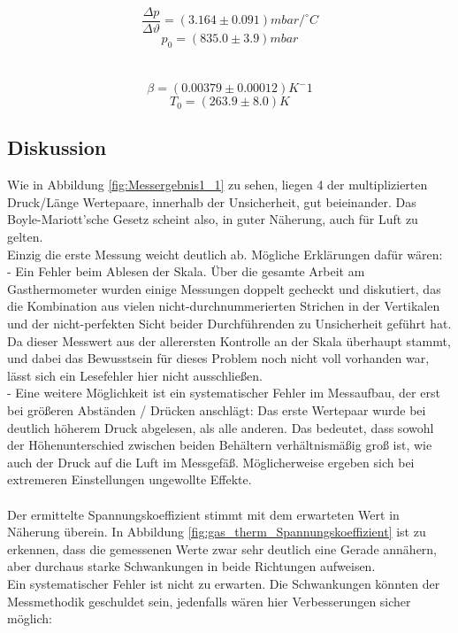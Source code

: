 \documentclass[12pt,a4paper]{article}
\begin{document}
\begin{multicols}{2}
$$\frac{\Delta p}{\Delta \vartheta} = (3.164 \pm 0.091) mbar/ ^\circ C$$
$$ p_0 = (835.0 \pm 3.9) mbar$$\\
\\
$$\beta = (0.00379 \pm 0.00012) K^-1$$
$$T_0 =(263.9 \pm 8.0)K$$



\subsection{Diskussion}

Wie in Abbildung \ref{fig:Messergebnis1_1} zu sehen, liegen 4 der multiplizierten Druck/Länge Wertepaare, innerhalb der Unsicherheit, gut beieinander. Das Boyle-Mariott'sche Gesetz scheint also, in guter Näherung, auch für Luft zu gelten.\\
Einzig die erste Messung weicht deutlich ab. Mögliche Erklärungen dafür wären:\\
\indent - Ein Fehler beim Ablesen der Skala. Über die gesamte Arbeit am Gasthermometer wurden einige Messungen doppelt gecheckt und diskutiert, das die Kombination aus vielen nicht-durchnummerierten Strichen in der Vertikalen und der nicht-perfekten Sicht beider Durchführenden zu Unsicherheit geführt hat.\\
Da dieser Messwert aus der allerersten Kontrolle an der Skala überhaupt stammt, und dabei das Bewusstsein für dieses Problem noch nicht voll vorhanden war,  lässt sich ein Lesefehler hier nicht ausschließen.\\
\indent - Eine weitere Möglichkeit ist ein systematischer Fehler im Messaufbau, der erst bei größeren Abständen / Drücken anschlägt: Das erste Wertepaar wurde bei deutlich höherem Druck abgelesen, als alle anderen. Das bedeutet, dass sowohl der Höhenunterschied zwischen beiden Behältern verhältnismäßig groß ist, wie auch der Druck auf die Luft im Messgefäß. Möglicherweise ergeben sich bei extremeren Einstellungen ungewollte Effekte.\\
\\
Der ermittelte Spannungskoeffizient stimmt mit dem erwarteten Wert in Näherung überein. In Abbildung \ref{fig:gas_therm_Spannungskoeffizient} ist zu erkennen, dass die gemessenen Werte zwar sehr deutlich eine Gerade annähern, aber durchaus starke Schwankungen in beide Richtungen aufweisen.\\
Ein systematischer Fehler ist nicht zu erwarten. Die Schwankungen könnten der Messmethodik geschuldet sein, jedenfalls wären hier Verbesserungen sicher möglich:\\

\end{multicols}
\end{document}
